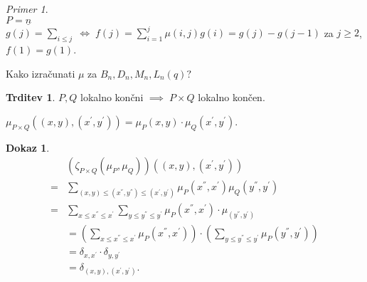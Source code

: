 \documentclass[a4paper, 12pt]{book}
\theoremstyle{definition}
\newtheorem{claim}[counter]{Trditev}
\newtheorem{pro}[counter]{Dokaz}
\theoremstyle{remark}
\newtheorem*{ex}{Primer}
\begin{document}
\begin{ex} \text{} \\
  $P = \underline{n}$ \\
  $g(j) = \sum_{i \leq j} \; \iff \; f(j) = \sum_{i=1}^j \mu(i,j) g(i) = g(j) - g(j-1)$ za $j \geq 2$, \\
  $f(1) = g(1)$.  
\end{ex}
Kako izračunati $\mu$ za $B_n, D_n, M_n, L_n(q)?$ \\
\begin{claim}
  $P, Q$ lokalno končni $\implies \; P \times Q$ lokalno končen.
\end{claim}
$\mu_{P \times Q} \left((x,y), (x^{'}, y^{'})\right) = \mu_P(x,y) \cdot \mu_Q(x^{'}, y^{'})$.
\begin{pro}
  \begin{align*}
    &\left(\zeta_{P \times Q} (\mu_P, \mu_Q)\right) \left((x,y), (x^{'}, y^{'})\right) \\
    =& \sum_{(x,y) \leq (x^{''},y^{''}) \leq (x^{'},y^{'})} \mu_P(x^{''},x^{'}) \mu_Q(y^{''},y^{'}) \\
    =& \sum_{x \leq x^{''} \leq x^{'}} \sum_{y \leq y^{''} \leq y^{'}}
      \mu_P(x^{''}, x^{'}) \cdot \mu_(y^{''}, y^{'}) \\
    &= \left(\sum_{x \leq x^{''} \leq x^{'}} \mu_P(x^{''}, x^{'})\right) \cdot 
      \left(\sum_{y \leq y^{''} \leq y^{'}} \mu_P(y^{''}, y^{'})\right) \\
    &= \delta_{x,x^{'}} \cdot \delta_{y,y^{'}} \\
    &= \delta_{(x,y), (x^{'},y^{'})}.
  \end{align*}
\end{pro}
\end{document}
